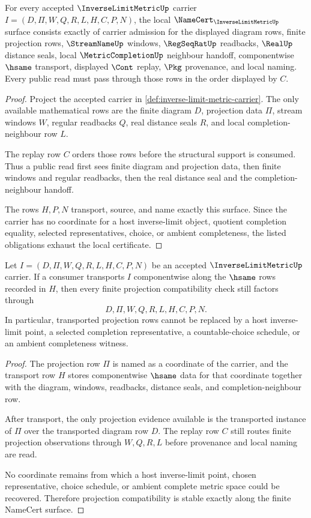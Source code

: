 \begin{theorem}\label{thm:inverse-limit-metric-namecert-obligations}
For every accepted $\InverseLimitMetricUp$ carrier $I=(D,\Pi,W,Q,R,L,H,C,P,N)$, the local $\NameCert_{\InverseLimitMetricUp}$ surface consists exactly of carrier admission for the displayed diagram rows, finite projection rows, $\StreamNameUp$ windows, $\RegSeqRatUp$ readbacks, $\RealUp$ distance seals, local $\MetricCompletionUp$ neighbour handoff, componentwise $\hsame$ transport, displayed $\Cont$ replay, $\Pkg$ provenance, and local naming. Every public read must pass through those rows in the order displayed by $C$.
\end{theorem}
\begin{proof}
Project the accepted carrier in \autoref{def:inverse-limit-metric-carrier}. The only available mathematical rows are the finite diagram $D$, projection data $\Pi$, stream windows $W$, regular readbacks $Q$, real distance seals $R$, and local completion-neighbour row $L$.

The replay row $C$ orders those rows before the structural support is consumed. Thus a public read first sees finite diagram and projection data, then finite windows and regular readbacks, then the real distance seal and the completion-neighbour handoff.

The rows $H,P,N$ transport, source, and name exactly this surface. Since the carrier has no coordinate for a host inverse-limit object, quotient completion equality, selected representatives, choice, or ambient completeness, the listed obligations exhaust the local certificate.
\end{proof}

\begin{theorem}\label{thm:inverse-limit-metric-projection-stability}
Let $I=(D,\Pi,W,Q,R,L,H,C,P,N)$ be an accepted $\InverseLimitMetricUp$ carrier. If a consumer transports $I$ componentwise along the $\hsame$ rows recorded in $H$, then every finite projection compatibility check still factors through
$$
D,\Pi,W,Q,R,L,H,C,P,N .
$$
In particular, transported projection rows cannot be replaced by a host inverse-limit point, a selected completion representative, a countable-choice schedule, or an ambient completeness witness.
\end{theorem}
\begin{proof}
The projection row $\Pi$ is named as a coordinate of the carrier, and the transport row $H$ stores componentwise $\hsame$ data for that coordinate together with the diagram, windows, readbacks, distance seals, and completion-neighbour row.

After transport, the only projection evidence available is the transported instance of $\Pi$ over the transported diagram row $D$. The replay row $C$ still routes finite projection observations through $W,Q,R,L$ before provenance and local naming are read.

No coordinate remains from which a host inverse-limit point, chosen representative, choice schedule, or ambient complete metric space could be recovered. Therefore projection compatibility is stable exactly along the finite NameCert surface.
\end{proof}

